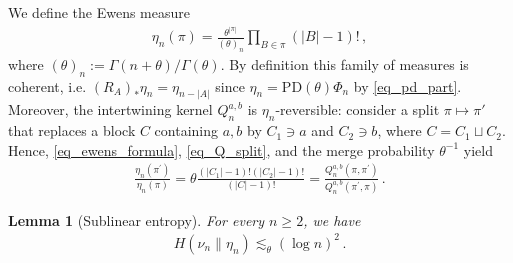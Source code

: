 \documentclass[a4paper,11pt]{article}
\numberwithin{equation}{section}
\newtheorem{lemma}[theorem]{Lemma}
\begin{document}
We define the Ewens measure 
\begin{equation}\label{eq_ewens_formula}
\begin{aligned}
\eta_{n} ( \pi)
=
\frac{
\theta^{|\pi|}}{
( \theta)_{n}}
\prod_{B \in \pi} ( |B| -1)!\,,
\end{aligned}
\end{equation}
where $ ( \theta)_{n}:= \Gamma ( n + \theta)/ \Gamma( \theta)$. By definition this family of measures is coherent, i.e. $ (R_{A} )_{\ast}\eta_{n}  = \eta_{n-|A|}$ since $\eta_n=\mathrm{PD}(\theta)\Phi_n$ by \eqref{eq_pd_part}. Moreover, the intertwining kernel $Q_n^{a,b}$ is $\eta_n$-reversible: consider a split $ \pi \mapsto \pi' $
that replaces a block $C$ containing $a,b$ by $C_1 \ni a $ and $C_2 \ni b$, where $C=C_1\sqcup C_2$.
 Hence, \eqref{eq_ewens_formula}, \eqref{eq_Q_split}, and the merge probability $ \theta^{-1}$ yield 
\begin{equation*}
\begin{aligned}
\frac{\eta_n(\pi^{\prime})}{\eta_n(\pi)}
=\theta\frac{(|C_1|-1)!(|C_2|-1)!}{(|C|-1)!}
=
\frac{Q_n^{a,b}(\pi,\pi^{\prime})}{Q_n^{a,b}(\pi^{\prime},\pi)}  \,.
\end{aligned}
\end{equation*}



\begin{lemma}[Sublinear entropy]\label{lem_entropy1}
	For every $n \geqslant 2$, we have 
	\begin{equation*}
	\begin{aligned}
	H ( \nu_{n}\| \eta_{n}) \lesssim_{\theta}
	( \log{ n })^{2}\,.
	\end{aligned}
	\end{equation*}

\end{lemma}
\end{document}
